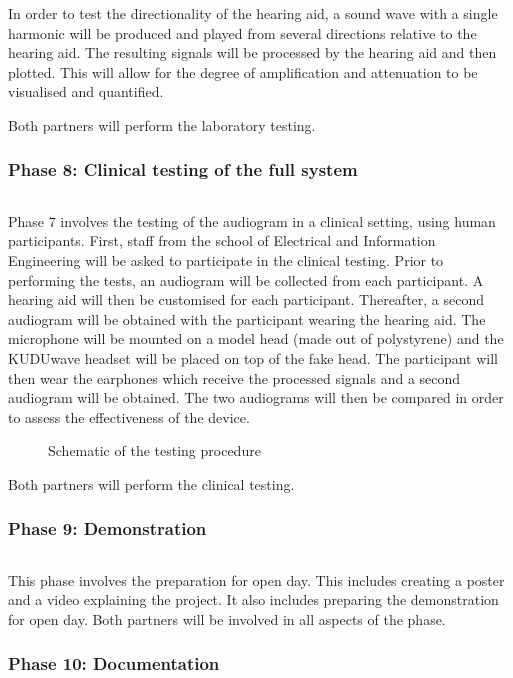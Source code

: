 \documentclass[10pt,twocolumn]{witseiepaper}
\begin{document}
In order to test the directionality of the hearing aid, a sound wave with a single harmonic will be produced and played from several directions relative to the hearing aid. The resulting signals will be processed by the hearing aid and then plotted. This will allow for the degree of amplification and attenuation to be visualised and quantified.

Both partners will perform the laboratory testing.

\subsubsection*{Phase 8: Clinical testing of the full system} $    $

Phase 7 involves the testing of the audiogram in a clinical setting, using human participants. First, staff from the school of Electrical and Information Engineering will be asked to participate in the clinical testing. Prior to performing the tests, an audiogram will be collected from each participant. A hearing aid will then be customised for each participant. Thereafter, a second audiogram will be obtained with the participant wearing the hearing aid. The microphone will be mounted on a model head (made out of polystyrene) and the KUDUwave headset will be placed on top of the fake head. The participant will then wear the earphones which receive the processed signals and a second audiogram will be obtained. The two audiograms will then be compared in order to assess the effectiveness of the device.

\begin{figure}[h]
	\centering
	\caption{Schematic of the testing procedure}
	\raggedright
	\label{fig:testing}	
\end{figure}

Both partners will perform the clinical testing.

\subsubsection*{Phase 9: Demonstration} $    $

This phase involves the preparation for open day. This includes creating a poster and a video explaining the project. It also includes preparing the demonstration for open day. Both partners will be involved in all aspects of the phase.

\subsubsection*{Phase 10: Documentation} $    $
\end{document}
